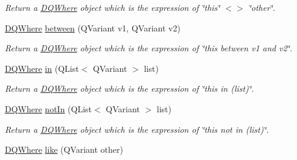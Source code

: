 \begin{DoxyCompactItemize}
\begin{DoxyCompactList}\small\item\em Return a \hyperlink{classDQWhere}{DQWhere} object which is the expression of \char`\"{}this\char`\"{} $<$$>$ \char`\"{}other\char`\"{}. \item\end{DoxyCompactList}\item 
\hypertarget{classDQWhere_a954b18f786c09239c3337c483881236a}{
\hyperlink{classDQWhere}{DQWhere} \hyperlink{classDQWhere_a954b18f786c09239c3337c483881236a}{between} (QVariant v1, QVariant v2)}
\label{classDQWhere_a954b18f786c09239c3337c483881236a}

\begin{DoxyCompactList}\small\item\em Return a \hyperlink{classDQWhere}{DQWhere} object which is the expression of \char`\"{}this between v1 and v2\char`\"{}. \item\end{DoxyCompactList}\item 
\hypertarget{classDQWhere_affe2789957734655930ed044700c13ec}{
\hyperlink{classDQWhere}{DQWhere} \hyperlink{classDQWhere_affe2789957734655930ed044700c13ec}{in} (QList$<$ QVariant $>$ list)}
\label{classDQWhere_affe2789957734655930ed044700c13ec}

\begin{DoxyCompactList}\small\item\em Return a \hyperlink{classDQWhere}{DQWhere} object which is the expression of \char`\"{}this in (list)\char`\"{}. \item\end{DoxyCompactList}\item 
\hypertarget{classDQWhere_a648490bc4ca0e2d7cdf652c2e3ac23ec}{
\hyperlink{classDQWhere}{DQWhere} \hyperlink{classDQWhere_a648490bc4ca0e2d7cdf652c2e3ac23ec}{notIn} (QList$<$ QVariant $>$ list)}
\label{classDQWhere_a648490bc4ca0e2d7cdf652c2e3ac23ec}

\begin{DoxyCompactList}\small\item\em Return a \hyperlink{classDQWhere}{DQWhere} object which is the expression of \char`\"{}this not in (list)\char`\"{}. \item\end{DoxyCompactList}\item 
\hypertarget{classDQWhere_ad10a1ab5a951f04839708de5819710e1}{
\hyperlink{classDQWhere}{DQWhere} \hyperlink{classDQWhere_ad10a1ab5a951f04839708de5819710e1}{like} (QVariant other)}
\label{classDQWhere_ad10a1ab5a951f04839708de5819710e1}


\end{DoxyCompactItemize}
